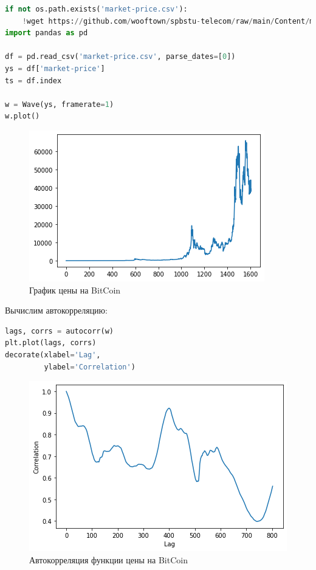 \begin{lstlisting}[language=Python]
if not os.path.exists('market-price.csv'):
    !wget https://github.com/wooftown/spbstu-telecom/raw/main/Content/market-price.csv
import pandas as pd

df = pd.read_csv('market-price.csv', parse_dates=[0])
ys = df['market-price']
ts = df.index

w = Wave(ys, framerate=1)
w.plot()

\end{lstlisting}
\begin{figure}[H]
	\begin{center}
		\includegraphics[scale=1]{fig/lab05/lab05_25_0.png}
		\caption{График цены на BitCoin}
	\end{center}
\end{figure}

Вычислим автокорреляцию:

\begin{lstlisting}[language=Python]
lags, corrs = autocorr(w)
plt.plot(lags, corrs)
decorate(xlabel='Lag',
         ylabel='Correlation')
\end{lstlisting}
\begin{figure}[H]
	\begin{center}
		\includegraphics[scale=1]{fig/lab05/lab05_27_0.png}
		\caption{Автокорреляция функции цены на BitCoin}
	\end{center}
\end{figure}

